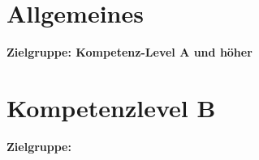\documentclass[
ngerman,
paper=a4,
asymmetric,
fontsize=9.5pt,
draft=false,
numbers=noenddot,
footnotes=multiple,
toc=flat,
]{scrbook}
\begin{document}
% 
% 
% 
% 






\part{Allgemeines}

{\sffamily\noindent \textbf{Zielgruppe: Kompetenz-Level A und höher}
}



% 

% 






\part{Kompetenzlevel B}

{\sffamily\noindent \textbf{Zielgruppe: }
}



\end{document}
